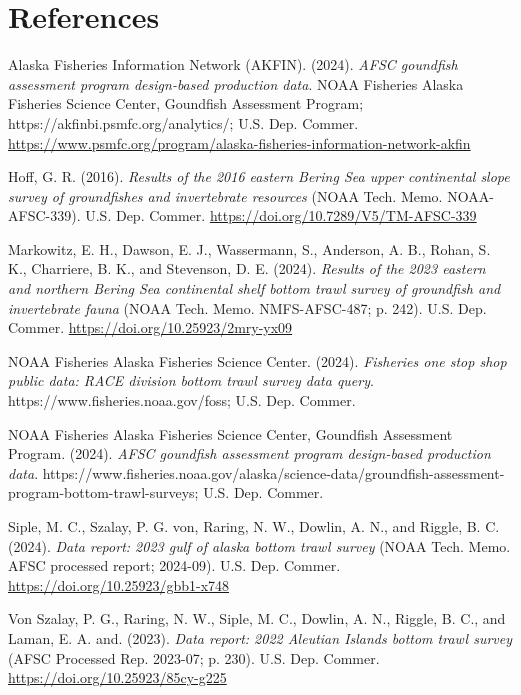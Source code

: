 \documentclass[
  letterpaper,
  oneside,
  open=any]{scrbook}
\newlength{\cslhangindent}
\newenvironment{CSLReferences}[2] %
 {\begin{list}{}{%
  \setlength{\itemindent}{0pt}
  \setlength{\leftmargin}{0pt}
  \setlength{\parsep}{0pt}
  \ifodd #1
   \setlength{\leftmargin}{\cslhangindent}
   \setlength{\itemindent}{-1\cslhangindent}
  \fi
  \setlength{\itemsep}{#2\baselineskip}}}
 {\end{list}}
\begin{document}
\chapter{References}\label{references}

\label{refs}
\begin{CSLReferences}{1}{0}
Alaska Fisheries Information Network (AKFIN). (2024). \emph{AFSC
goundfish assessment program design-based production data}. {NOAA
Fisheries Alaska Fisheries Science Center, Goundfish Assessment
Program}; https://akfinbi.psmfc.org/analytics/; {U.S. Dep. Commer.}
\url{https://www.psmfc.org/program/alaska-fisheries-information-network-akfin}

Hoff, G. R. (2016). \emph{Results of the 2016 eastern {Bering Sea} upper
continental slope survey of groundfishes and invertebrate resources}
(NOAA Tech. Memo. NOAA-AFSC-339). {U.S. Dep. Commer.}
\url{https://doi.org/10.7289/V5/TM-AFSC-339}

Markowitz, E. H., Dawson, E. J., Wassermann, S., Anderson, A. B., Rohan,
S. K., Charriere, B. K., and Stevenson, D. E. (2024). \emph{Results of
the 2023 eastern and northern {Bering Sea} continental shelf bottom
trawl survey of groundfish and invertebrate fauna} (NOAA Tech. Memo.
NMFS-AFSC-487; p. 242). {U.S. Dep. Commer.}
\url{https://doi.org/10.25923/2mry-yx09}

NOAA Fisheries Alaska Fisheries Science Center. (2024). \emph{Fisheries
one stop shop public data: RACE division bottom trawl survey data
query}. https://www.fisheries.noaa.gov/foss; {U.S. Dep. Commer.}

NOAA Fisheries Alaska Fisheries Science Center, Goundfish Assessment
Program. (2024). \emph{AFSC goundfish assessment program design-based
production data}.
https://www.fisheries.noaa.gov/alaska/science-data/groundfish-assessment-program-bottom-trawl-surveys;
{U.S. Dep. Commer.}

Siple, M. C., Szalay, P. G. von, Raring, N. W., Dowlin, A. N., and
Riggle, B. C. (2024). \emph{Data report: 2023 gulf of alaska bottom
trawl survey} (NOAA Tech. Memo. AFSC processed report; 2024-09). {U.S.
Dep. Commer.} \url{https://doi.org/10.25923/gbb1-x748}

Von Szalay, P. G., Raring, N. W., Siple, M. C., Dowlin, A. N., Riggle,
B. C., and Laman, E. A. and. (2023). \emph{Data report: 2022 {Aleutian
Islands} bottom trawl survey} (AFSC Processed Rep. 2023-07; p. 230).
{U.S. Dep. Commer.} \url{https://doi.org/10.25923/85cy-g225}

\end{CSLReferences}


\backmatter
\end{document}
